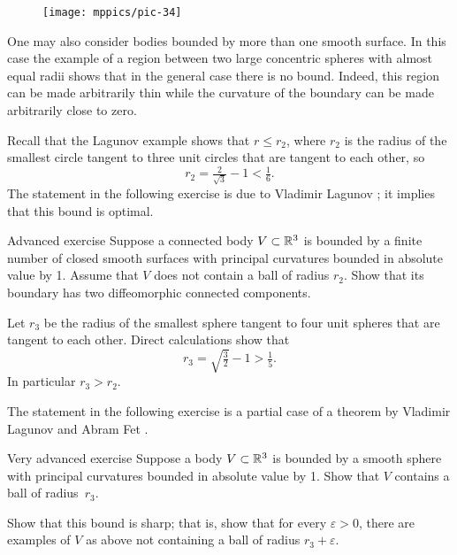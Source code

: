 \begin{wrapfigure}{o}{25 mm}
\vskip-0mm
\centering
\texttt{[image: mppics/pic-34]}
\vskip0mm
\end{wrapfigure}

One may also consider bodies bounded by more than one smooth surface.
In this case the example of a region between two large concentric spheres with almost equal radii shows that in the general case there is no bound.
Indeed, this region can be made arbitrarily thin while the curvature of the boundary can be made arbitrarily close to zero.

Recall that the Lagunov example shows that $r\le r_2$,
where $r_2$ is the radius of the smallest circle tangent to three unit circles that are tangent to each other,
so 
\[r_2=\tfrac2{\sqrt{3}}-1< \tfrac16.\]
The statement in the following exercise is due to Vladimir Lagunov \cite{lagunov-1960};
it implies that this bound is optimal.

\begin{thm}{Advanced exercise}\label{ex:thin}
Suppose a connected body $V\subset \mathbb{R}^3$ is bounded by a finite number of closed smooth surfaces with principal curvatures bounded in absolute value by 1.
Assume that $V$ does not contain a ball of radius $r_2$.
Show that its boundary has two diffeomorphic  connected components. 
\end{thm}


Let $r_3$
be the radius of the smallest sphere tangent to four unit spheres that are tangent to each other.
Direct calculations show that 
\[r_3=\sqrt{\tfrac32}-1>\tfrac15.\]
In particular $r_3>r_2$.

The statement in the following exercise is a partial case of a theorem by Vladimir Lagunov and Abram Fet \cite{lagunov-fet-1963, lagunov-fet-1965}.

\begin{thm}{Very advanced exercise}\label{ex:PI-sphere}
Suppose a body $V\subset \mathbb{R}^3$ is bounded by a smooth sphere with principal curvatures bounded in absolute value by 1.
Show that $V$ contains a ball of radius~$r_3$.

Show that this bound is sharp; that is, show that for every $\varepsilon >0$, there are examples of $V$ as above not containing a ball of radius $r_3+ \varepsilon$.
\end{thm}




